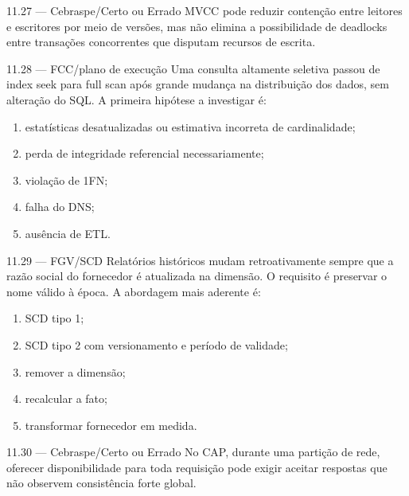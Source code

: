 \begin{questao}{ 11.27 — Cebraspe/Certo ou Errado}
MVCC pode reduzir contenção entre leitores e escritores por meio de versões, mas não elimina a possibilidade de deadlocks entre transações concorrentes que disputam recursos de escrita.
\end{questao}

\begin{questao}{ 11.28 — FCC/plano de execução}
Uma consulta altamente seletiva passou de index seek para full scan após grande mudança na distribuição dos dados, sem alteração do SQL. A primeira hipótese a investigar é:
\begin{enumerate}[label=\Alph*)]
\item estatísticas desatualizadas ou estimativa incorreta de cardinalidade;
\item perda de integridade referencial necessariamente;
\item violação de 1FN;
\item falha do DNS;
\item ausência de ETL.
\end{enumerate}
\end{questao}

\begin{questao}{ 11.29 — FGV/SCD}
Relatórios históricos mudam retroativamente sempre que a razão social do fornecedor é atualizada na dimensão. O requisito é preservar o nome válido à época. A abordagem mais aderente é:
\begin{enumerate}[label=\Alph*)]
\item SCD tipo 1;
\item SCD tipo 2 com versionamento e período de validade;
\item remover a dimensão;
\item recalcular a fato;
\item transformar fornecedor em medida.
\end{enumerate}
\end{questao}

\begin{questao}{ 11.30 — Cebraspe/Certo ou Errado}
No CAP, durante uma partição de rede, oferecer disponibilidade para toda requisição pode exigir aceitar respostas que não observem consistência forte global.
\end{questao}

